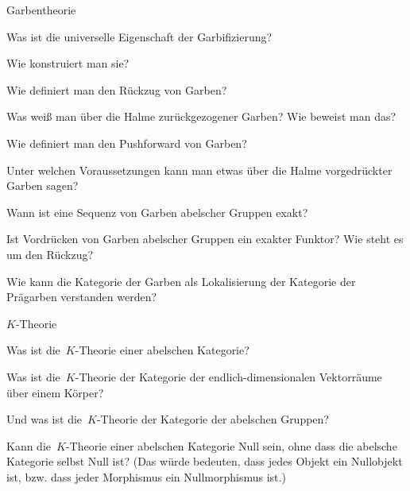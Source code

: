 \documentclass{uebblatt}
\begin{document}
\begin{aufgabeE}{Garbentheorie}
\item Was ist die universelle Eigenschaft der Garbifizierung?
\item Wie konstruiert man sie?
\item Wie definiert man den Rückzug von Garben?
\item Was weiß man über die Halme zurückgezogener Garben? Wie beweist man das?
\item Wie definiert man den Pushforward von Garben?
\item Unter welchen Voraussetzungen kann man etwas über die Halme vorgedrückter
Garben sagen?
\item Wann ist eine Sequenz von Garben abelscher Gruppen exakt?
\item Ist Vordrücken von Garben abelscher Gruppen ein exakter Funktor? Wie
steht es um den Rückzug?
\item Wie kann die Kategorie der Garben als Lokalisierung der Kategorie der
Prägarben verstanden werden?
\end{aufgabeE}

\begin{aufgabeE}{$K$-Theorie}
\item Was ist die~$K$-Theorie einer abelschen Kategorie?
\item Was ist die~$K$-Theorie der Kategorie der endlich-dimensionalen
Vektorräume über einem Körper?
\item Und was ist die~$K$-Theorie der Kategorie der abelschen Gruppen?
\item Kann die~$K$-Theorie einer abelschen Kategorie Null sein, ohne dass die
abelsche Kategorie selbst Null ist? (Das würde bedeuten, dass jedes Objekt ein
Nullobjekt ist, bzw. dass jeder Morphismus ein Nullmorphismus ist.)
\end{aufgabeE}
\end{document}
